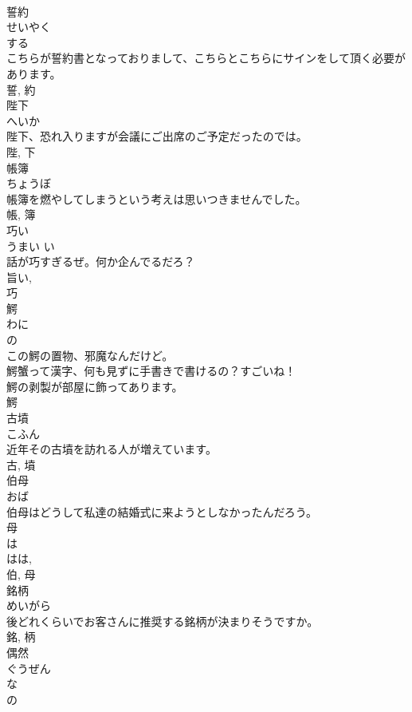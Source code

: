 \documentclass[8pt]{extreport}
\begin{document}
\begin{CJK}{UTF8}{min}
\\	誓約	
\\	せいやく	
\\	する 
\\	こちらが誓約書となっておりまして、こちらとこちらにサインをして頂く必要があります。	
\\	誓, 約	
\\	陛下	
\\	へいか	
\\	陛下、恐れ入りますが会議にご出席のご予定だったのでは。	
\\	陛, 下	
\\	帳簿	
\\	ちょうぼ	
\\	帳簿を燃やしてしまうという考えは思いつきませんでした。	
\\	帳, 簿	
\\	巧い	
\\	うまい	い 
\\	話が巧すぎるぜ。何か企んでるだろ？	
\\	旨い, 
\\	巧	
\\	鰐	
\\	わに	
\\	の 
\\	この鰐の置物、邪魔なんだけど。	
\\	鰐蟹って漢字、何も見ずに手書きで書けるの？すごいね！	
\\	鰐の剥製が部屋に飾ってあります。	
\\	鰐	
\\	古墳	
\\	こふん	
\\	近年その古墳を訪れる人が増えています。	
\\	古, 墳	
\\	伯母	
\\	おば	
\\	伯母はどうして私達の結婚式に来ようとしなかったんだろう。	
\\	母 
\\	は 
\\	はは, 
\\	伯, 母	
\\	銘柄	
\\	めいがら	
\\	後どれくらいでお客さんに推奨する銘柄が決まりそうですか。	
\\	銘, 柄	
\\	偶然	
\\	ぐうぜん	
\\	な 
\\	の 

\end{CJK}
\end{document}
